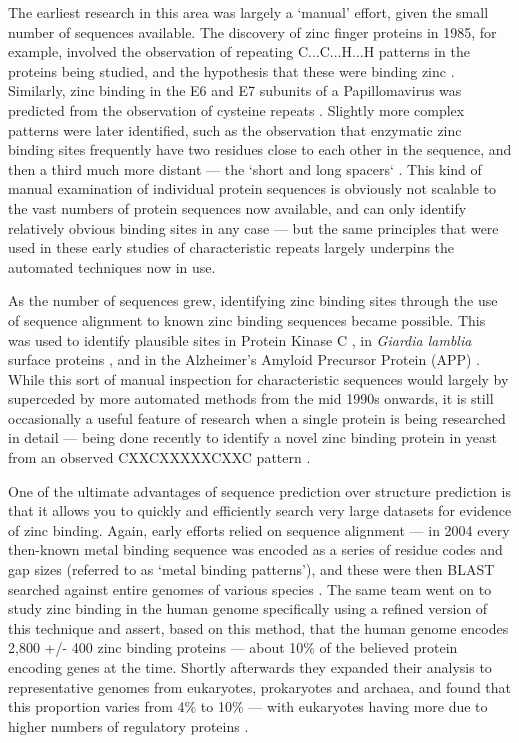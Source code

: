 The earliest research in this area was largely a `manual' effort, given the small number of sequences available. The discovery of zinc finger proteins in 1985, for example, involved the observation of repeating C...C...H...H patterns in the proteins being studied, and the hypothesis that these were binding zinc \cite{miller1985repetitive}. Similarly, zinc binding in the E6 and E7 subunits of a Papillomavirus was predicted from the observation of cysteine repeats \cite{barbosa1989papillomavirus}. Slightly more complex patterns were later identified, such as the observation that enzymatic zinc binding sites frequently have two residues close to each other in the sequence, and then a third much more distant --- the `short and long spacers` \cite{vallee1989short}. This kind of manual examination of individual protein sequences is obviously not scalable to the vast numbers of protein sequences now available, and can only identify relatively obvious binding sites in any case --- but the same principles that were used in these early studies of characteristic repeats largely underpins the automated techniques now in use.

As the number of sequences grew, identifying zinc binding sites through the use of sequence alignment to known zinc binding sequences became possible. This was used to identify plausible sites in Protein Kinase C \cite{bishop1991identification}, in {\it Giardia lamblia} surface proteins \cite{nash1993variant}, and in the Alzheimer's Amyloid Precursor Protein (APP) \cite{bush1993novel}. While this sort of manual inspection for characteristic sequences would largely by superceded by more automated methods from the mid 1990s onwards, it is still occasionally a useful feature of research when a single protein is being researched in detail --- being done recently to identify a novel zinc binding protein in yeast from an observed CXXCXXXXXCXXC pattern \cite{furukawa2018identification}.

One of the ultimate advantages of sequence prediction over structure prediction is that it allows you to quickly and efficiently search very large datasets for evidence of zinc binding. Again, early efforts relied on sequence alignment --- in 2004 every then-known metal binding sequence was encoded as a series of residue codes and gap sizes (referred to as `metal binding patterns'), and these were then BLAST searched against entire genomes of various species \cite{andreini2004hint}. The same team went on to study zinc binding in the human genome specifically using a refined version of this technique and assert, based on this method, that the human genome encodes 2,800 +/- 400 zinc binding proteins --- about 10\% of the believed protein encoding genes at the time\cite{andreini2006counting}. Shortly afterwards they expanded their analysis to representative genomes from eukaryotes, prokaryotes and archaea, and found that this proportion varies from 4\% to 10\% --- with eukaryotes having more due to higher numbers of regulatory proteins \cite{passerini2007predicting}.

